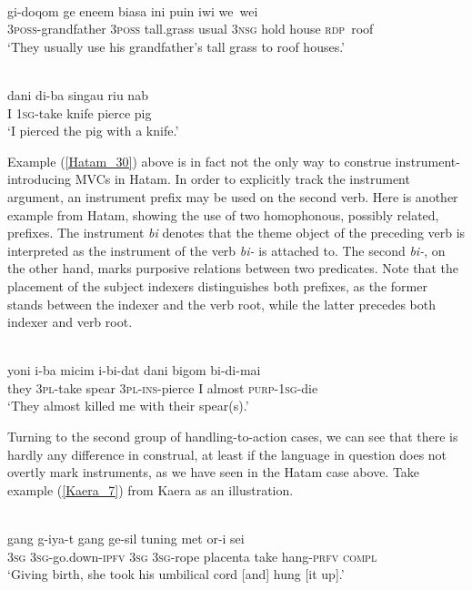 \ea \label{Klon_87}
\\
\gll gi-doqom ge eneem biasa ini puin iwi we~wei\\
3\textsc{poss}-grandfather 3\textsc{poss} tall.grass usual 3\textsc{nsg} hold house \textsc{rdp}~roof\\
\glft `They usually use his grandfather's tall grass to roof houses.'\\ 
\z

\ea \label{Hatam_30}
\\
\gll dani di-ba singau riu nab \\
I 1\textsc{sg}-take knife pierce pig \\
\glft `I pierced the pig with a knife.'\\ 
\z

Example (\ref{Hatam_30}) above is in fact not the only way to construe instrument-introducing MVCs in Hatam. In order to explicitly track the instrument argument, an instrument prefix may be used on the second verb. Here is another example from Hatam, showing the use of two homophonous, possibly related, prefixes. The instrument \textit{bi} denotes that the theme object of the preceding verb is interpreted as the instrument of the verb \textit{bi-} is attached to. The second \textit{bi-}, on the other hand, marks purposive relations between two predicates. Note that the placement of the subject indexers distinguishes both prefixes, as the former stands between the indexer and the verb root, while the latter precedes both indexer and verb root.

\ea 
{}\\
\gll yoni i-ba micim i-bi-dat dani bigom bi-di-mai \\
they 3\textsc{pl}-take spear 3\textsc{pl}-\textsc{ins}-pierce I almost \textsc{purp}-1\textsc{sg}-die \\
\glft `They almost killed me with their spear(s).'\\ 
\z

Turning to the second group of handling-to-action cases, we can see that there is hardly any difference in construal, at least if the language in question does not overtly mark instruments, as we have seen in the Hatam case above. Take example (\ref{Kaera_7}) from Kaera as an illustration.

\ea \label{Kaera_7}
\\
\gll gang g-iya-t gang ge-sil tuning met or-i sei \\
3\textsc{sg} 3\textsc{sg}-go.down-\textsc{ipfv} 3\textsc{sg} 3\textsc{sg}-rope placenta take hang-\textsc{prfv} \textsc{compl} \\
\glft `Giving birth, she took his umbilical cord [and] hung [it up].'\\ 
\z

